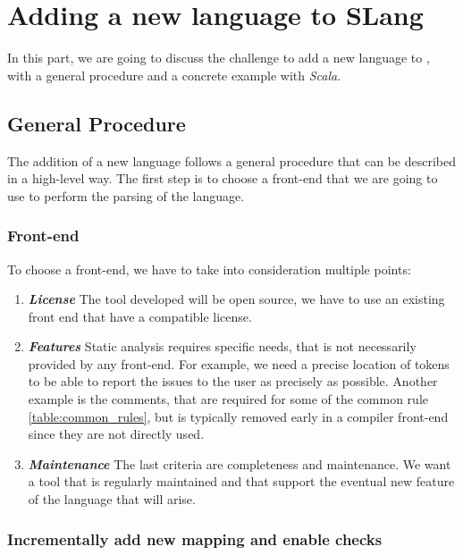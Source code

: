 \section{Adding a new language to SLang}
\label{sec:new_language}

In this part, we are going to discuss the challenge to add a new language to \slang{}, with a general procedure and a concrete example with \emph{Scala}.

\subsection{General Procedure}
\label{subsec:general_procedure}

The addition of a new language follows a general procedure that can be described in a high-level way.
The first step is to choose a front-end that we are going to use to perform the parsing of the language.

\subsubsection{Front-end}
\label{subsubsec:front_end}

To choose a front-end, we have to take into consideration multiple points:
\begin{enumerate}
	\item \textbf{\textit{License}} \newline The tool developed will be open source, we have to use an existing front end that have a compatible license.
	\item \textbf{\textit{Features}} \newline Static analysis requires specific needs, that is not necessarily provided by any front-end. 	For example, we need a precise location of tokens to be able to report the issues to the user as precisely as possible. Another example is the comments, that are required for some of the common rule \ref{table:common_rules}, but is typically removed early in a compiler front-end since they are not directly used.
	\item \textbf{\textit{Maintenance}} \newline 
	The last criteria are completeness and maintenance. We want a tool that is regularly maintained and that support the eventual new feature of the language that will arise. 
\end{enumerate}

\subsubsection{Incrementally add new mapping and enable checks}
\label{subsubsec:new_mapping_and_enables_rules}


